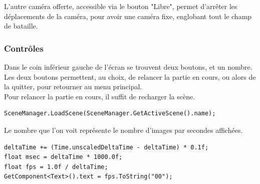 \documentclass{report}
\begin{document}
L'autre caméra offerte, accessible via le bouton "Libre", permet d'arrêter les déplacements de la caméra, pour avoir une caméra fixe, englobant tout le champ de bataille.

\subsubsection{Contrôles}
Dans le coin inférieur gauche de l'écran se trouvent deux boutons, et un nombre.
Les deux boutons permettent, au choix, de relancer la partie en cours, ou alors de la quitter, pour retourner au menu principal.\\
Pour relancer la partie en cours, il suffit de recharger la scène.

\begin{lstlisting}[language={[Sharp]C},label={lst:RestartScene()}, caption= Extrait du code de CanvasHUD.cs]
SceneManager.LoadScene(SceneManager.GetActiveScene().name);
\end{lstlisting}	

Le nombre que l'on voit représente le nombre d'images par secondes affichées.

\begin{lstlisting}[language={[Sharp]C},label={lst:Update()}, caption= Extrait du code de FPSScript.cs]
deltaTime += (Time.unscaledDeltaTime - deltaTime) * 0.1f;
float msec = deltaTime * 1000.0f;
float fps = 1.0f / deltaTime;
GetComponent<Text>().text = fps.ToString("00");
\end{lstlisting}	
 
\end{document}
